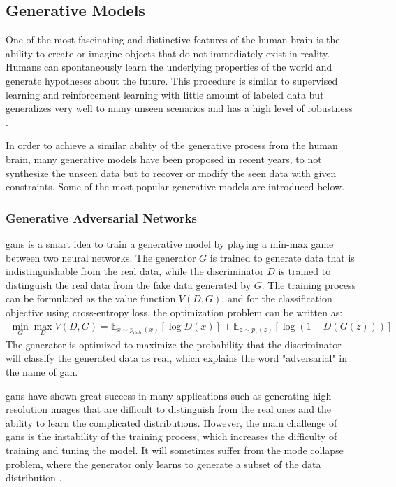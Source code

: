 \documentclass[12pt,DIV14,BCOR12mm,a4paper,footinclude=false,headinclude,parskip=half-,twoside,openright,cleardoublepage=empty,toc=index,bibliography=totoc,listof=totoc]{scrreprt}
\numberwithin{equation}{chapter}
\begin{document}
\subsection{Generative Models}
One of the most fascinating and distinctive features of the human brain is the ability to create or imagine objects that do not immediately exist in reality. Humans can spontaneously learn the underlying properties of the world and generate hypotheses about the future. This procedure is similar to supervised learning and reinforcement learning with little amount of labeled data but generalizes very well to many unseen scenarios and has a high level of robustness \cite{lamb2021brief}.

In order to achieve a similar ability of the generative process from the human brain, many generative models have been proposed in recent years, to not synthesize the unseen data but to recover or modify the seen data with given constraints. Some of the most popular generative models are introduced below.

\subsubsection{Generative Adversarial Networks}
\glspl{gan} \cite{goodfellow2014generative} is a smart idea to train a generative model by playing a min-max game between two neural networks. The generator $G$ is trained to generate data that is indistinguishable from the real data, while the discriminator $D$ is trained to distinguish the real data from the fake data generated by $G$. The training process can be formulated as the value function $V(D,G)$, and for the classification objective using cross-entropy loss, the optimization problem can be written as:
\begin{align}
  \min_{G} \max_{D} V(D,G) = \mathbb{E}_{x\sim p_{data}(x)}[\log D(x)] + \mathbb{E}_{z\sim p_{z}(z)}[\log(1-D(G(z)))]
\end{align}
The generator is optimized to maximize the probability that the discriminator will classify the generated data as real, which explains the word "adversarial" in the name of \gls{gan}.

\glspl{gan} have shown great success in many applications such as generating high-resolution images that are difficult to distinguish from the real ones and the ability to learn the complicated distributions. However, the main challenge of \glspl{gan} is the instability of the training process, which increases the difficulty of training and tuning the model. It will sometimes suffer from the mode collapse problem, where the generator only learns to generate a subset of the data distribution \cite{borji2018pros}.
\end{document}
